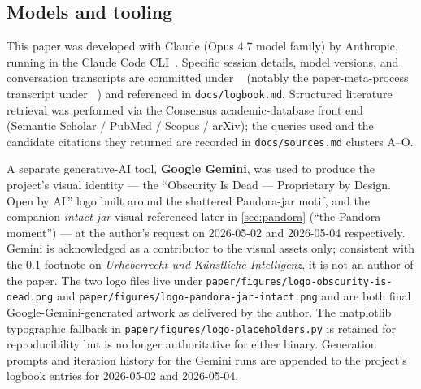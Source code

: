 \documentclass[11pt,a4paper]{article}
\begin{document}
\subsection{Models and tooling}
\label{sec:ai-disclosure-models}
This paper was developed with Claude (Opus 4.7 model family) by
Anthropic, running in the Claude Code CLI~\citep{anthropic2026claude}.
Specific session details, model versions, and conversation transcripts
are committed under
~
(notably the paper-meta-process transcript
 under
~)
and referenced in
\texttt{docs/logbook.md}. Structured literature retrieval was performed
via the Consensus academic-database front end (Semantic Scholar /
PubMed / Scopus / arXiv); the queries used and the candidate citations
they returned are recorded in \texttt{docs/sources.md} clusters A--O.

A separate generative-AI tool, \textbf{Google Gemini}, was used to
produce the project's visual identity --- the ``Obscurity Is Dead ---
Proprietary by Design. Open by AI.'' logo built around the shattered
Pandora-jar motif, and the companion \emph{intact-jar} visual
referenced later in \cref{sec:pandora} (``the Pandora moment'') ---
at the author's request on 2026-05-02 and 2026-05-04 respectively.
Gemini is acknowledged as a contributor to the visual assets only;
consistent with the \cref{sec:ai-disclosure-models} footnote on
\emph{Urheberrecht und K\"unstliche Intelligenz}, it is not an
author of the paper. The two logo files live under
\texttt{paper/figures/logo-obscurity-is-dead.png} and
\texttt{paper/figures/logo-pandora-jar-intact.png} and are both
final Google-Gemini-generated artwork as delivered by the author.
The matplotlib typographic fallback in
\texttt{paper/figures/logo-placeholders.py} is retained for
reproducibility but is no longer authoritative for either binary.
Generation prompts and iteration history for the Gemini runs are
appended to the project's logbook entries for 2026-05-02 and
2026-05-04.
\end{document}

